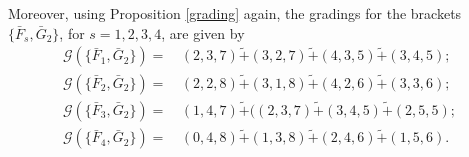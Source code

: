 \documentclass[10pt]{amsart}
\theoremstyle{definition}
\theoremstyle{corollary}
\theoremstyle{remark}
\theoremstyle{conclusion}
\begin{document}
Moreover, using Proposition \ref{grading} again, the gradings for the brackets $\{\bar{F}_s,\bar{G}_2\}$, for $s=1,2,3,4$, are given by 
 \begin{align}
    \mathcal{G} \left(\{\bar{F}_1, \bar{G}_2\}\right)  = & \, (2,3,7) \tilde{+} (3,2,7)\tilde{+} (4,3,5)\tilde{+} (3,4,5); \nonumber \\
    \mathcal{G} \left(\{\bar{F}_2, \bar{G}_2\}\right)  = & \, (2,2,8) \tilde{+} (3,1,8)\tilde{+} (4,2,6)\tilde{+} (3,3,6) ; \nonumber  \\
    \mathcal{G} \left(\{\bar{F}_3, \bar{G}_2\}\right)  = & \, (1,4,7) \tilde{+} ((2,3,7)\tilde{+} (3,4,5)\tilde{+} (2,5,5); \nonumber \\
    \mathcal{G} \left(\{\bar{F}_4, \bar{G}_2\}\right)  = & \, (0,4,8) \tilde{+} (1,3,8)\tilde{+} (2,4,6)\tilde{+} (1,5,6).
\end{align}  
\end{document}
